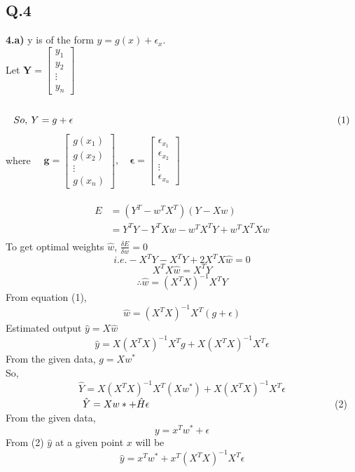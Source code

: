 \documentclass[17pt]{article}
\begin{document}
\subsection*{Q.4}
\textbf{4.a)} y is of the form $y = g(x) + \epsilon_x$.\\
Let $\mathbf{Y} = {\begin{bmatrix}y_{1}\\y_{2}\\\vdots \\y_{n}\end{bmatrix}}$\\\\
$$So,\: Y = g + \epsilon \hspace{9.5cm}(1)$$
where $\quad {\mathbf {g}}={\begin{bmatrix}g(x_1)\\g(x_2)\\\vdots \\g(x_n)\end{bmatrix}},\quad {\mathbf {\epsilon}}={\begin{bmatrix}\epsilon_{x_1}\\\epsilon_{x_2}\\\vdots \\\epsilon_{x_n}\end{bmatrix}}$\\\\
\begin{equation*}
\begin{split}
E &= (Y^T -w^TX^T)(Y - Xw)\\
    &= Y^TY - Y^TXw  - w^TX^TY + w^TX^TXw\\
\end{split}
\end{equation*}
To get optimal weights $\hat{w}$, $ \frac{\delta E}{\delta w} = 0$\\
$$i.e. -X^TY - X^TY + 2X^TX\hat{w} = 0$$
$$ X^TX\hat{w} = X^TY$$
$$ \therefore \hat{w} = (X^TX)^{-1}X^TY$$
From equation (1),
$$\hat{w} = (X^TX)^{-1}X^T(g+\epsilon)$$
Estimated output $\hat{y} = X\hat{w}$
$$\hat{y} = X(X^TX)^{-1}X^Tg+ X(X^TX)^{-1}X^T\epsilon$$
From the given data, $g = Xw^*$\\
So, 
$$\hat{Y} = X(X^TX)^{-1}X^T(Xw^*)+ X(X^TX)^{-1}X^T\epsilon$$
$\hspace{2.75cm}\hat{Y} = Xw* + \hat{H}\epsilon \hspace{6.5cm}$ (2)\\    
From the given data, $$ y = x^Tw^* + \epsilon$$
From (2) $\hat{y}$ at a given point $x$ will be
$$\hat{y} = x^Tw^* + x^T(X^TX)^{-1}X^T\epsilon$$
\end{document}
